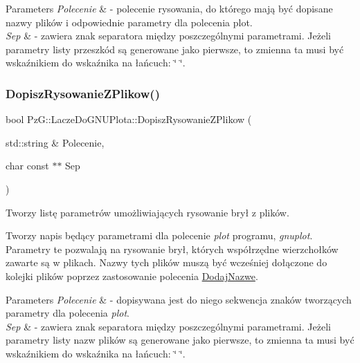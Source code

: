 \begin{DoxyParams}{Parameters}
{\em Polecenie} & -\/ polecenie rysowania, do którego mają być dopisane nazwy plików i odpowiednie parametry dla polecenia plot. \\
\hline
{\em Sep} & -\/ zawiera znak separatora między poszczególnymi parametrami. Jeżeli parametry listy przeszkód są generowane jako pierwsze, to zmienna ta musi być wskaźnikiem do wskaźnika na łańcuch\+: \char`\"{} \char`\"{}. \\
\hline
\end{DoxyParams}
\mbox{\label{classPzG_1_1LaczeDoGNUPlota_ad3d7607946b82aa941d786dcd086d27e}} 
\subsubsection{\texorpdfstring{Dopisz\+Rysowanie\+Z\+Plikow()}{DopiszRysowanieZPlikow()}}
{\footnotesize\ttfamily bool Pz\+G\+::\+Lacze\+Do\+G\+N\+U\+Plota\+::\+Dopisz\+Rysowanie\+Z\+Plikow (\begin{DoxyParamCaption}\item[{std\+::string \&}]{Polecenie,  }\item[{char const $\ast$$\ast$}]{Sep }\end{DoxyParamCaption})}



Tworzy listę parametrów umożliwiających rysowanie brył z plików. 

Tworzy napis będący parametrami dla polecenie {\itshape plot} programu, {\itshape gnuplot}. Parametry te pozwalają na rysowanie brył, których współrzędne wierzchołków zawarte są w plikach. Nazwy tych plików muszą być wcześniej dołączone do kolejki plików poprzez zastosowanie polecenia \hyperlink{}{Dodaj\+Nazwe}.


\begin{DoxyParams}{Parameters}
{\em Polecenie} & -\/ dopisywana jest do niego sekwencja znaków tworzących parametry dla polecenia {\itshape plot}. \\
\hline
{\em Sep} & -\/ zawiera znak separatora między poszczególnymi parametrami. Jeżeli parametry listy nazw plików są generowane jako pierwsze, to zmienna ta musi być wskaźnikiem do wskaźnika na łańcuch\+: \char`\"{} \char`\"{}. \\
\hline
\end{DoxyParams}

